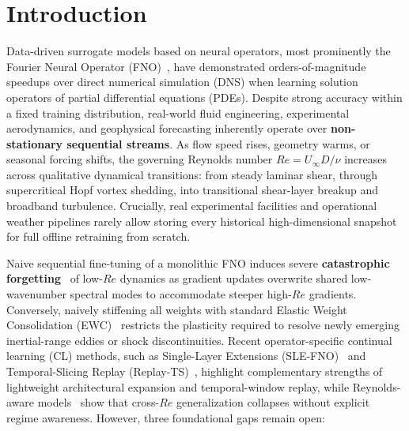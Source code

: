 \documentclass[11pt,a4paper]{article}
\begin{document}
\section{Introduction}

Data-driven surrogate models based on neural operators, most prominently the Fourier Neural Operator (FNO)~\cite{li2021fno}, have demonstrated orders-of-magnitude speedups over direct numerical simulation (DNS) when learning solution operators of partial differential equations (PDEs). Despite strong accuracy within a fixed training distribution, real-world fluid engineering, experimental aerodynamics, and geophysical forecasting inherently operate over \textbf{non-stationary sequential streams}. As flow speed rises, geometry warms, or seasonal forcing shifts, the governing Reynolds number $Re = U_{\infty} D / \nu$ increases across qualitative dynamical transitions: from steady laminar shear, through supercritical Hopf vortex shedding, into transitional shear-layer breakup and broadband turbulence. Crucially, real experimental facilities and operational weather pipelines rarely allow storing every historical high-dimensional snapshot for full offline retraining from scratch.

Naive sequential fine-tuning of a monolithic FNO induces severe \textbf{catastrophic forgetting}~\cite{kirkpatrick2017ewc} of low-$Re$ dynamics as gradient updates overwrite shared low-wavenumber spectral modes to accommodate steeper high-$Re$ gradients. Conversely, naively stiffening all weights with standard Elastic Weight Consolidation (EWC)~\cite{kirkpatrick2017ewc,schwarz2018onlineewc} restricts the plasticity required to resolve newly emerging inertial-range eddies or shock discontinuities. Recent operator-specific continual learning (CL) methods, such as Single-Layer Extensions (SLE-FNO)~\cite{elhadidy2026slefno} and Temporal-Slicing Replay (Replay-TS)~\cite{hemati2026replayts}, highlight complementary strengths of lightweight architectural expansion and temporal-window replay, while Reynolds-aware models~\cite{guo2026renanet} show that cross-$Re$ generalization collapses without explicit regime awareness. However, three foundational gaps remain open:
\end{document}

